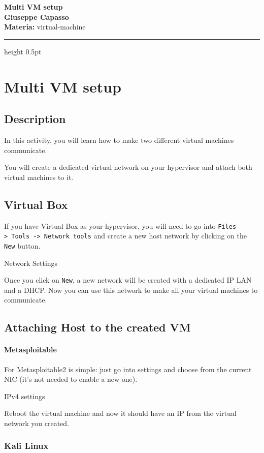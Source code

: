\documentclass[11pt,a4paper]{article}
\newcommand{\proposaltitle}[1]{
    \begin{center}
        \vspace*{0.1cm}
        {\LARGE \bfseries \color{blue} #1} \\[1.5ex]
        {\large \textbf{Giuseppe Capasso}} \\[1ex]
                \small{
            \vspace{0.1cm}
            \textbf{Materia:} virtual-machine\\
        }
            \end{center}
    \vspace{0.3cm}
    \hrule height 0.5pt
    \vspace{0.5cm}
}
\begin{document}
\proposaltitle{Multi VM setup}

\section{Multi VM setup}\label{multi-vm-setup}

\subsection{Description}\label{description}

In this activity, you will learn how to make two different virtual
machines communicate.

You will create a dedicated virtual network on your hypervisor and
attach both virtual machines to it.

\subsection{Virtual Box}\label{virtual-box}

If you have Virtual Box as your hypervisor, you will need to go into
\texttt{Files\ -\textgreater{}\ Tools\ -\textgreater{}\ Network\ tools}
and create a new host network by clicking on the \texttt{New} button.

Network Settings

Once you click on \texttt{New}, a new network will be created with a
dedicated IP LAN and a DHCP. Now you can use this network to make all
your virtual machines to communicate.

\subsection{Attaching Host to the created
VM}\label{attaching-host-to-the-created-vm}

\paragraph{Metasploitable}\label{metasploitable}

For Metasploitable2 is simple: just go into settings and choose from the
current NIC (it's not needed to enable a new one).

IPv4 settings

Reboot the virtual machine and now it should have an IP from the virtual
network you created.

\subsubsection{Kali Linux}\label{kali-linux}
\end{document}
